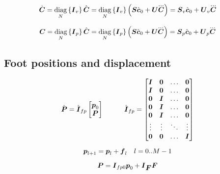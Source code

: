 \documentclass[12pt,a4paper]{article}
\begin{document}
\begin{equation*}
    \cVel = 
        \diag{N}{\M{I}_{v}} \cState = 
        \diag{N}{\M{I}_{v}} \left(\M{S} \cstate_0  +  \M{U} \cJerk \right) = 
        \M{S}_v \cstate_0 + \M{U}_v \cJerk
\end{equation*}

\begin{equation*}
    \cPos = 
        \diag{N}{\M{I}_{p}} \cState = 
        \diag{N}{\M{I}_{p}} \left(\M{S} \cstate_0  +  \M{U} \cJerk \right) = 
        \M{S}_{p} \cstate_0 + \M{U}_{p} \cJerk
\end{equation*}


\subsection{Foot positions and displacement}
\begin{equation*}
    \hat{\mbox{\boldmath $P$}} = \hat{\mbox{\boldmath $I$}}_{fp} 
    \begin{bmatrix}
        \mbox{\boldmath $p$}_0\\
        \mbox{\boldmath $P$}\\
    \end{bmatrix}
    \quad\quad\quad
    \hat{\mbox{\boldmath $I$}}_{fp} =
    \begin{bmatrix}
        \mbox{\boldmath $I$}   &   \mbox{\boldmath $0$}   &   \dots   &   \mbox{\boldmath $0$} \\
        \mbox{\boldmath $I$}   &   \mbox{\boldmath $0$}   &   \dots   &   \mbox{\boldmath $0$} \\
        \mbox{\boldmath $0$}   &   \mbox{\boldmath $I$}   &   \dots   &   \mbox{\boldmath $0$} \\
        \mbox{\boldmath $0$}   &   \mbox{\boldmath $I$}   &   \dots   &   \mbox{\boldmath $0$} \\
        \mbox{\boldmath $0$}   &   \mbox{\boldmath $I$}   &   \dots   &   \mbox{\boldmath $0$} \\
        \vdots  &   \vdots  &   \ddots  &   \vdots \\
        \mbox{\boldmath $0$}   &   \mbox{\boldmath $0$}   &   \dots   &   \mbox{\boldmath $I$} \\
    \end{bmatrix}
\end{equation*}


\begin{equation*}
    \mbox{\boldmath $p$}_{l+1} = \mbox{\boldmath $p$}_l + \mbox{\boldmath $f$}_{l}
    \quad
    l = 0..M-1
\end{equation*}

\begin{equation*}
    \mbox{\boldmath $P$} = 
    \mbox{\boldmath $I$}_{fp0}
    \mbox{\boldmath $p$}_0 
    + 
    \mbox{\boldmath $I$}_{\mbox{\boldmath $F$}}
    \mbox{\boldmath $F$}
\end{equation*}
\end{document}
